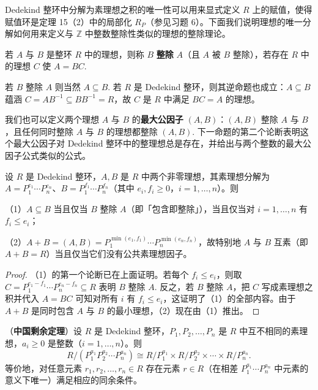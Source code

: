 Dedekind 整环中分解为素理想之积的唯一性可以用来显式定义 \(R\) 上的赋值，使得赋值环是定理 15（2）中的局部化 \(R_P\)（参见习题 6）。下面我们说明理想的唯一分解如何用来定义与 \(\mathbb{Z}\) 中整数整除性类似的理想的整除理论。

\begin{definition}
若 \(A\) 与 \(B\) 是整环 \(R\) 中的理想，则称 \(B\) \textbf{整除} \(A\)（且 \(A\) 被 \(B\) 整除），若存在 \(R\) 中的理想 \(C\) 使 \(A = BC\).
\end{definition}

若 \(B\) 整除 \(A\) 则当然 \(A \subseteq B\). 若 \(R\) 是 Dedekind 整环，则其逆命题也成立：\(A \subseteq B\) 蕴涵 \(C = AB^{-1} \subseteq BB^{-1} = R\)，故 \(C\) 是 \(R\) 中满足 \(BC = A\) 的理想。

我们也可以定义两个理想 \(A\) 与 \(B\) 的\textbf{最大公因子} \((A,B)\)：\((A,B)\) 整除 \(A\) 与 \(B\)，且任何同时整除 \(A\) 与 \(B\) 的理想都整除 \((A,B)\). 下一命题的第二个论断表明这个最大公因子对 Dedekind 整环中的整理想总是存在，并给出与两个整数的最大公因子公式类似的公式。

\begin{proposition}\label{pro:16.17}
设 \(R\) 是 Dedekind 整环，\(A, B\) 是 \(R\) 中两个非零理想，其素理想分解为 \(A = P_1^{e_1}\cdots P_n^{e_n}\)、\(B = P_1^{f_1}\cdots P_n^{f_n}\)（其中 \(e_i, f_i \geq 0\)，\(i = 1, \ldots, n\)）。则

（1）\(A \subseteq B\) 当且仅当 \(B\) 整除 \(A\)（即「包含即整除」），当且仅当对 \(i = 1, \ldots, n\) 有 \(f_i \leq e_i\)；

（2）\(A+B = (A,B) = P_1^{\min(e_1,f_1)}\cdots P_n^{\min(e_n,f_n)}\)，故特别地 \(A\) 与 \(B\) 互素（即 \(A+B = R\)）当且仅当它们没有公共素理想因子。
\end{proposition}

\begin{proof}
（1）的第一个论断已在上面证明。若每个 \(f_i \leq e_i\)，则取 \(C = P_1^{e_1-f_1}\cdots P_n^{e_n-f_n} \subseteq R\) 表明 \(B\) 整除 \(A\). 反之，若 \(B\) 整除 \(A\)，把 \(C\) 写成素理想之积并代入 \(A = BC\) 可知对所有 \(i\) 有 \(f_i \leq e_i\)，这证明了（1）的全部内容。由于 \(A+B\) 是同时包含 \(A\) 与 \(B\) 的最小理想，（2）现在由（1）推出。
\end{proof}

\begin{proposition}\label{pro:16.18}
（\textbf{中国剩余定理}）设 \(R\) 是 Dedekind 整环，\(P_1, P_2, \ldots, P_n\) 是 \(R\) 中互不相同的素理想，\(a_i \geq 0\) 是整数（\(i = 1, \ldots, n\)）。则
\[
R/(P_1^{a_1}P_2^{a_2}\cdots P_n^{a_n}) \cong R/P_1^{a_1} \times R/P_2^{a_2} \times \cdots \times R/P_n^{a_n}.
\]
等价地，对任意元素 \(r_1, r_2, \ldots, r_n \in R\) 存在元素 \(r \in R\)（在相差 \(P_1^{a_1}\cdots P_n^{a_n}\) 中元素的意义下唯一）满足相应的同余条件。
\end{proposition}

